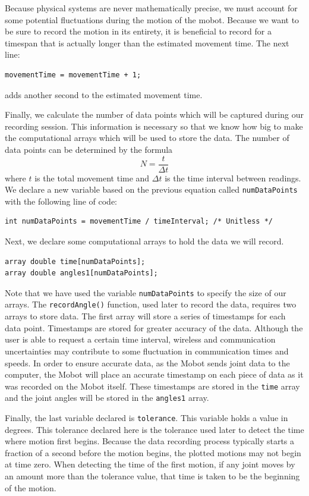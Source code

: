 \documentclass{article}
\begin{document}
Because physical systems are never mathematically precise, we must account for some
potential fluctuations during the motion of the mobot. Because we want to be sure 
to record the motion in its entirety, it is beneficial to record for a timespan that
is actually longer than the estimated movement time. The next line:
\begin{verbatim}
movementTime = movementTime + 1; 
\end{verbatim}
adds another second to the estimated movement time.

Finally, we calculate the number of data points which will be captured during our 
recording session. This information is necessary so that we know how big to make
the computational arrays which will be used to store the data. The number
of data points can be determined by the formula
\begin{equation*}
N = \frac{t}{\Delta t}
\end{equation*}
where $t$ is the total movement time and $\Delta t$ is the time interval between
readings. We declare a new variable based on the previous equation called \texttt{numDataPoints} with 
the following line of code:
\begin{verbatim}
int numDataPoints = movementTime / timeInterval; /* Unitless */
\end{verbatim}

Next, we declare some computational arrays to hold the data we will record.
\begin{verbatim}
array double time[numDataPoints];
array double angles1[numDataPoints];
\end{verbatim}
Note that we have used the variable \texttt{numDataPoints} to specify the size
of our arrays. The \texttt{recordAngle()} function, used later to record the data,
requires two arrays to store data. The first array will store a series of timestamps
for each data point. Timestamps are stored for greater accuracy of the data. Although
the user is able to request a certain time interval, wireless and communication 
uncertainties may contribute to some fluctuation in communication times and speeds. 
In order to ensure accurate data, as the Mobot sends joint data to the computer, 
the Mobot will place an accurate timestamp on each piece of data as it was recorded
on the Mobot itself. These timestamps are stored in the \texttt{time} array and
the joint angles will be stored in the \texttt{angles1} array.

Finally, the last variable declared is \texttt{tolerance}. This variable 
holds a value in degrees. This tolerance declared here is the tolerance used
later to detect the time where motion first begins. Because the data recording 
process typically starts a fraction of a second before the motion begins, the
plotted motions may not begin at time zero. When detecting the time of the
first motion, if any joint moves by an amount more than the tolerance value, 
that time is taken to be the beginning of the motion.
\end{document}
